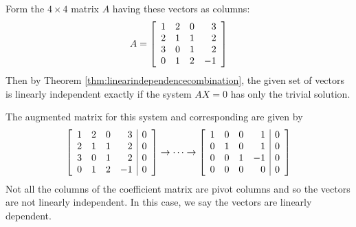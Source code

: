 \begin{solution}
Form the $4 \times 4$  matrix $A$ having these vectors as columns:
\begin{equation*}
A= \left[ 
\begin{array}{rrrr}
1 & 2 & 0 & 3 \\ 
2 & 1 & 1 & 2 \\ 
3 & 0 & 1 & 2 \\ 
0 & 1 & 2 & -1
\end{array}
\right]
\end{equation*}
Then by Theorem \ref{thm:linearindependencecombination}, the given set of vectors is linearly independent
exactly if the system $AX=0$ has only the trivial solution.

The augmented matrix for this system and corresponding {\rref} are given by  
\begin{equation*}
 \left[ 
\begin{array}{rrrr|r}
1 & 2 & 0 & 3 & 0 \\ 
2 & 1 & 1 & 2 & 0 \\ 
3 & 0 & 1 & 2 & 0 \\ 
0 & 1 & 2 & -1 & 0 
\end{array}
\right]
\rightarrow \cdots \rightarrow
\left[ 
\begin{array}{rrrr|r}
1 & 0 & 0 & 1 & 0 \\ 
0 & 1 & 0 & 1 & 0 \\ 
0 & 0 & 1 & -1 & 0 \\ 
0 & 0 & 0 & 0 & 0 
\end{array}
\right] 
\end{equation*}
Not all the columns of the coefficient matrix are pivot columns and so the vectors are not linearly independent. In this case, we say the vectors are linearly dependent. 


\end{solution}

